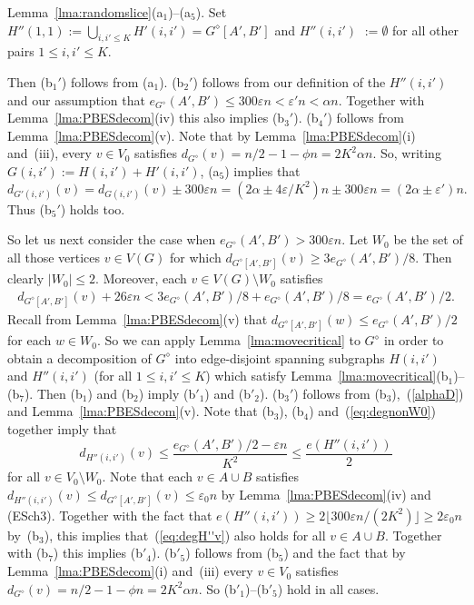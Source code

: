 \documentclass{memo-l}
\def\COMMENT#1{}
\def\eps{\varepsilon}
\numberwithin{section}{chapter}
\numberwithin{equation}{section}
\numberwithin{firstthm}{section}
\numberwithin{figure}{section}
\begin{document}
{Lemma~\ref{lma:randomslice}(a$_1$)--(a$_5$). Set $H''(1,1) := \bigcup_{i,i' \le K} H'(i,i') = G^{\diamond}[A',B']$ and
$H''(i,i') $ $:= \emptyset$ for all other pairs $1 \le i,i' \le K$.%
\COMMENT{AL: added $1 \le$}
 Then (b$_1'$) follows from (a$_1$).
(b$_2'$) follows from our definition of the $H''(i,i')$ and our assumption that $ e_{G^{\diamond}}(A',B') \le 300 \eps n< \eps' n <\alpha n$.
Together with Lemma~\ref{lma:PBESdecom}(iv) this also implies (b$_3'$). (b$_4'$) follows from Lemma~\ref{lma:PBESdecom}(v).
Note that by Lemma~\ref{lma:PBESdecom}(i) and~(iii),
every $v\in V_0$ satisfies $d_{G^\diamond}(v)=n/2-1-\phi n=2K^2\alpha n$.
So, writing $G(i,i'):=H(i,i')+H'(i,i')$, (a$_5$) implies that
$$
d_{G'(i,i')}(v )=d_{G(i,i')}(v)\pm 300 \eps n =(2\alpha \pm 4\eps/K^2)n\pm 300 \eps n=(2\alpha   \pm  \eps' )n.
$$
Thus (b$_5'$) holds too.

So let us next consider the case when $ e_{G^{\diamond}}(A',B') > 300 \eps n $.
Let $W_0$ be the set of all those vertices $v \in V(G)$ for which $d_{G^{\diamond}[A',B']}(v) \ge 3e_{G^{\diamond}}(A',B')/8$.
Then clearly $|W_0| \le 2$. Moreover, each $v \in V(G) \setminus W_0$ satisfies
\begin{align}\label{eq:degnonW0}
d_{G^{\diamond}[A',B']}(v) + 26 \eps n < 3e_{G^{\diamond}}(A',B')/8 + e_{G^{\diamond}}(A',B')/8 = e_{G^{\diamond}}(A',B')/2.
\end{align}
Recall from Lemma~\ref{lma:PBESdecom}(v) that $d_{G^{\diamond}[A',B']}(w) \le e_{G^{\diamond}}(A',B')/2$ for each $w\in W_0$. So we can
apply Lemma~\ref{lma:movecritical} to $G^{\diamond}$ in order to obtain a decomposition
of $G^{\diamond}$ into edge-disjoint spanning subgraphs $H(i,i')$ and $H''(i,i')$ (for all $1\le i,i' \le K$) which satisfy
Lemma~\ref{lma:movecritical}(b$_1$)--(b$_7$). Then (b$_1$) and (b$_2$) imply (b$'_1$) and (b$'_2$).
(b$_3'$) follows from (b$_3$),~(\ref{alphaD}) and Lemma~\ref{lma:PBESdecom}(v). Note that (b$_3$), (b$_4$) and~(\ref{eq:degnonW0})
together imply that
\begin{equation}\label{eq:degH''v}
d_{H''(i,i')}(v) \le \frac{e_{G^{\diamond}}(A',B')/2-\eps n}{K^2}\le \frac{e ( H''(i,i') )}{2}
\end{equation}
for all $v \in V_0 \setminus W_0$. Note that each $v\in A\cup B$ satisfies $d_{H''(i,i')}(v) \le d_{G^\diamond[A',B']}(v)\le \eps_0 n$ by
Lemma~\ref{lma:PBESdecom}(iv) and (ESch3). Together with the fact that $e ( H''(i,i'))\ge 2\lfloor 300\eps n/(2K^2)\rfloor \ge 2\eps_0 n$
by~(b$_3$), this implies that~(\ref{eq:degH''v}) also holds for all $v\in A\cup B$. 
 Together with (b$_7$) this implies (b$'_4$).
(b$'_5$) follows from (b$_5$) and the fact that by Lemma~\ref{lma:PBESdecom}(i) and~(iii)
every $v\in V_0$ satisfies $d_{G^\diamond}(v)=n/2-1-\phi n=2K^2\alpha n$.
So (b$'_1$)--(b$'_5$) hold in all cases.

}
\end{document}
